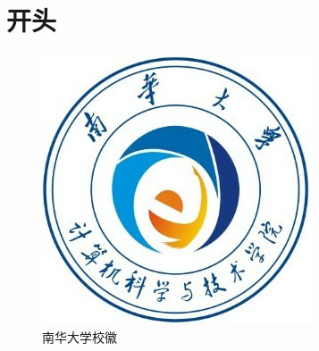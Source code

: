 \section{开头}
\setcounter{figure}{0}
\begin{figure}
	\centering
	\includegraphics{./Pictures/usc.png}	
	\caption{南华大学校徽}	
\end{figure}
